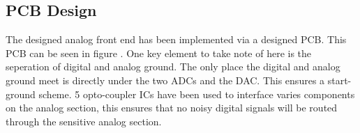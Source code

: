 \subsection{PCB Design} \label{subsec:PCBDesign}

The designed analog front end has been implemented via a designed PCB. This PCB can be seen in figure . One key element to take note of here is the seperation of digital and analog ground. The only place the digital and analog ground meet is directly under the two ADCs and the DAC. This ensures a start-ground scheme. 5 opto-coupler ICs have been used to interface varies components on the analog section, this ensures that no noisy digital signals will be routed through the sensitive analog section. 

